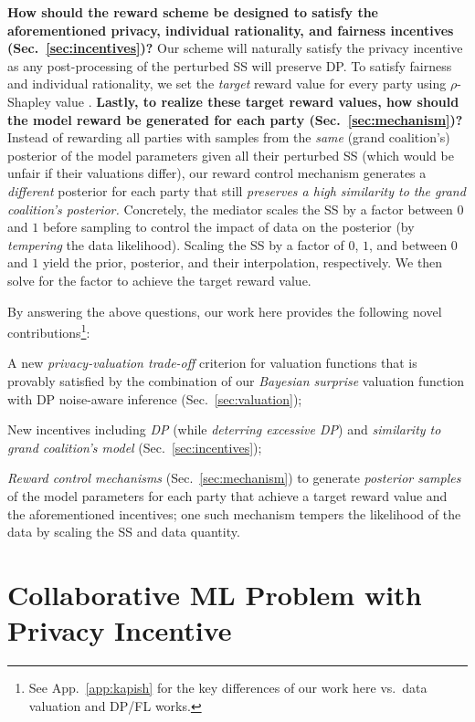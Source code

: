 \documentclass{article}
\DeclareRobustCommand{\hlp}[1]
{{#1}}
\theoremstyle{plain}
\theoremstyle{definition}
\theoremstyle{remark}
\begin{document}
{\bf How should the reward scheme be designed to satisfy the aforementioned privacy, individual rationality, and fairness incentives  (Sec.~\ref{sec:incentives})?} 
Our scheme will naturally satisfy the privacy incentive as any post-processing of the perturbed SS will preserve DP. To satisfy fairness and individual rationality, 
we set the \emph{target} reward value for every party using $\rho$-Shapley value \cite{simcollaborative}.
{\bf Lastly, to realize these target reward values, how should the model reward be generated for each party (Sec.~\ref{sec:mechanism})?}
Instead of rewarding all parties with samples from the \emph{same} (grand coalition's) posterior of the model parameters given all their perturbed SS (which would be unfair if their valuations differ), our reward control mechanism generates a \emph{different} posterior for each party that still \emph{preserves a high similarity to the grand coalition's posterior.}
Concretely, the mediator scales the SS by a factor between $0$ and $1$ before sampling to control the impact of data on the posterior (by \emph{tempering} the data likelihood). Scaling the SS by a factor of $0$, $1$, and  between $0$ and $1$ yield the prior, posterior, and their interpolation, respectively. We then solve for the factor to achieve the target reward value.

By answering the above questions, our work here 
provides the following novel contributions\footnote{\hlp{See App.~{\ref{app:kapish}} for the key differences of our work here vs.~data valuation and DP/FL works.}}:
\squishlisttwo
\item A new \emph{privacy-valuation trade-off} criterion for valuation functions that is provably satisfied by the combination of our \emph{Bayesian surprise} valuation function with DP noise-aware inference (Sec.~\ref{sec:valuation});
\item New incentives including \emph{DP} (while \emph{deterring excessive DP}) and \emph{similarity to grand coalition's model} (Sec.~\ref{sec:incentives});
\item  \emph{Reward control mechanisms} (Sec.~\ref{sec:mechanism}) %
to generate \emph{posterior samples} of the model parameters for each party that achieve a target reward value and the aforementioned incentives; one such mechanism tempers the likelihood of the data by scaling the SS and data quantity.

\squishend

\section{Collaborative ML Problem with Privacy Incentive}
\label{sec:problem}
\end{document}
